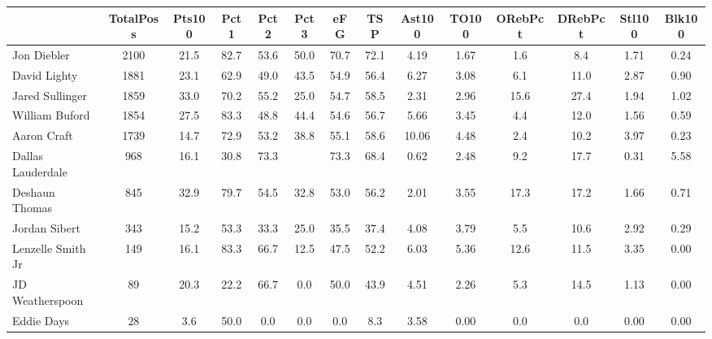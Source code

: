 \documentclass[10pt,letterpaper]{article}
\begin{document}
\begin{table}[ht]
\begin{center}
\begin{tabular}{lccccccccccccc}
  \hline
 & TotalPoss & Pts100 & Pct1 & Pct2 & Pct3 & eFG & TSP & Ast100 & TO100 & ORebPct & DRebPct & Stl100 & Blk100 \\ 
  \hline
Jon Diebler & 2100 & 21.5 & 82.7 & 53.6 & 50.0 & 70.7 & 72.1 & 4.19 & 1.67 & 1.6 & 8.4 & 1.71 & 0.24 \\ 
  David Lighty & 1881 & 23.1 & 62.9 & 49.0 & 43.5 & 54.9 & 56.4 & 6.27 & 3.08 & 6.1 & 11.0 & 2.87 & 0.90 \\ 
  Jared Sullinger & 1859 & 33.0 & 70.2 & 55.2 & 25.0 & 54.7 & 58.5 & 2.31 & 2.96 & 15.6 & 27.4 & 1.94 & 1.02 \\ 
  William Buford & 1854 & 27.5 & 83.3 & 48.8 & 44.4 & 54.6 & 56.7 & 5.66 & 3.45 & 4.4 & 12.0 & 1.56 & 0.59 \\ 
  Aaron Craft & 1739 & 14.7 & 72.9 & 53.2 & 38.8 & 55.1 & 58.6 & 10.06 & 4.48 & 2.4 & 10.2 & 3.97 & 0.23 \\ 
  Dallas Lauderdale & 968 & 16.1 & 30.8 & 73.3 &  & 73.3 & 68.4 & 0.62 & 2.48 & 9.2 & 17.7 & 0.31 & 5.58 \\ 
  Deshaun Thomas & 845 & 32.9 & 79.7 & 54.5 & 32.8 & 53.0 & 56.2 & 2.01 & 3.55 & 17.3 & 17.2 & 1.66 & 0.71 \\ 
  Jordan Sibert & 343 & 15.2 & 53.3 & 33.3 & 25.0 & 35.5 & 37.4 & 4.08 & 3.79 & 5.5 & 10.6 & 2.92 & 0.29 \\ 
  Lenzelle Smith Jr & 149 & 16.1 & 83.3 & 66.7 & 12.5 & 47.5 & 52.2 & 6.03 & 5.36 & 12.6 & 11.5 & 3.35 & 0.00 \\ 
  JD Weatherspoon & 89 & 20.3 & 22.2 & 66.7 & 0.0 & 50.0 & 43.9 & 4.51 & 2.26 & 5.3 & 14.5 & 1.13 & 0.00 \\ 
  Eddie Days & 28 & 3.6 & 50.0 & 0.0 & 0.0 & 0.0 & 8.3 & 3.58 & 0.00 & 0.0 & 0.0 & 0.00 & 0.00 \\ 
   \hline
\end{tabular}
\end{center}
\end{table}
\end{document}
